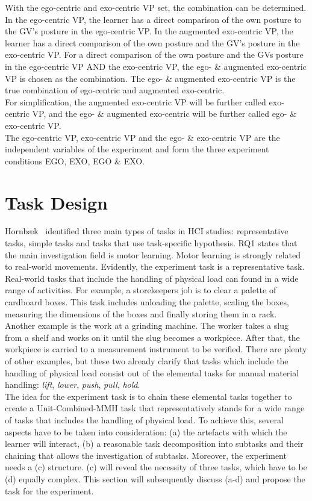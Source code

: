 With the ego-centric and exo-centric VP set, the combination can be determined. In the ego-centric VP, the learner has a direct comparison of the own posture to the GV's posture in the ego-centric VP. In the augmented exo-centric VP, the learner has a direct comparison of the own posture and the GV's posture in the exo-centric VP. For a direct comparison of the own posture and the GVs posture in the ego-centric VP AND the exo-centric VP, the ego- \& augmented exo-centric VP is chosen as the combination. The ego- \& augmented exo-centric VP is the true combination of ego-centric and augmented exo-centric.\\
For simplification, the augmented exo-centric VP will be further called exo-centric VP, and the ego- \& augmented exo-centric will be further called ego- \& exo-centric VP.\\
The ego-centric VP, exo-centric VP and the ego- \& exo-centric VP are the independent variables of the experiment and form the three experiment conditions EGO, EXO, EGO \& EXO.

\section{Task Design}
\label{sec:taskDesign}
Hornb\ae{}k~\cite{hornbaek} identified three main types of tasks in HCI studies: representative tasks, simple tasks and tasks that use task-specific hypothesis. RQ1 states that the main investigation field is motor learning. Motor learning is strongly related to real-world movements. Evidently, the experiment task is a representative task.\\
Real-world tasks that include the handling of physical load can found in a wide range of activities. For example, a storekeepers job is to clear a palette of cardboard boxes. This task includes unloading the palette, scaling the boxes, measuring the dimensions of the boxes and finally storing them in a rack. Another example is the work at a grinding machine. The worker takes a slug from a shelf and works on it until the slug becomes a workpiece. After that, the workpiece is carried to a measurement instrument to be verified. There are plenty of other examples, but these two already clarify that tasks which include the handling of physical load consist out of the elemental tasks for manual material handling: \textit{lift}, \textit{lower}, \textit{push}, \textit{pull}, \textit{hold}.\\
The idea for the experiment task is to chain these elemental tasks together to create a Unit-Combined-MMH task that representatively stands for a wide range of tasks that includes the handling of physical load. To achieve this, several aspects have to be taken into consideration: (a) the artefacts with which the learner will interact, (b) a reasonable task decomposition into subtasks and their chaining that allows the investigation of subtasks. Moreover, the experiment needs a (c) structure. (c) will reveal the necessity of three tasks, which have to be (d) equally complex. This section will subsequently discuss (a-d) and propose the task for the experiment.

